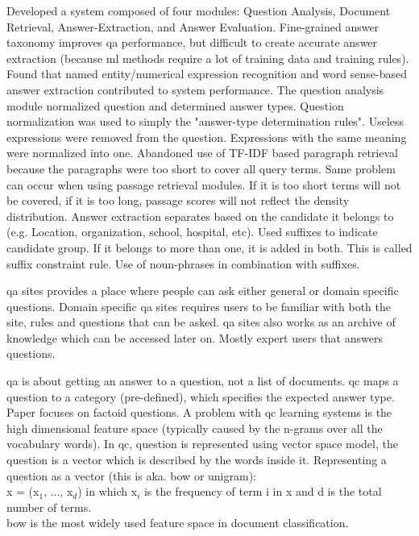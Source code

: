 Developed a system composed of four modules: Question Analysis, Document Retrieval, Answer-Extraction, and Answer Evaluation.
Fine-grained answer taxonomy improves \gls{qa} performance, but difficult to create accurate answer extraction 
(because \gls{ml} methods require a lot of training data and training rules). 
Found that named entity/numerical expression recognition and word sense-based answer extraction contributed to system performance.
The question analysis module normalized question and determined answer types. 
Question normalization was used to simply the "answer-type determination rules". 
Useless expressions were removed from the question. 
Expressions with the same meaning were normalized into one. 
Abandoned use of TF-IDF based paragraph retrieval because the paragraphs were too short to cover all query terms. 
Same problem can occur when using  passage retrieval modules. 
If it is too short terms will not be covered, if it is too long, passage scores will not reflect the density distribution.
Answer extraction separates based on the candidate it belongs to (e.g. Location, organization, school, hospital, etc).  
Used suffixes to indicate candidate group. If it belongs to more than one, it is added in both. 
This is called suffix constraint rule. 
Use of noun-phrases in combination with suffixes.
\cite{Isozaki2005}



\gls{qa} sites provides a place where people can ask either general or domain specific questions. 
Domain specific \gls{qa} sites requires users to be familiar with both the site, rules and questions that can be asked. 
\gls{qa} sites also works as an archive of knowledge which can be accessed later on. Mostly expert users that answers questions.
\cite{Movshovitz-Attias2013}





\gls{qa} is about getting an answer to a question, not a list of documents.
\gls{qc} maps a question to a category (pre-defined), which specifies the expected answer type.
Paper focuses on factoid questions. 
A problem with \gls{qc} learning systems is the high dimensional feature space (typically caused by the n-grams over all the vocabulary words).
In \gls{qc}, question is represented using vector space model, the question is a vector which is described by the words inside it. 
Representing a question as a vector (this is aka. \gls{bow} or unigram): \\
x = (x$_{1}$, ..., x$_{d}$) in which x$_{i}$ is the frequency of term i in x and d is the total number of terms. \\
\gls{bow} is the most widely used feature space in document classification.
\cite{Loni2011}




